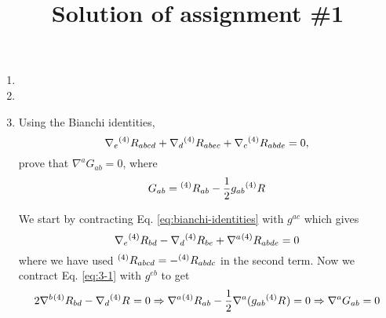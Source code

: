 \documentclass[10pt]{article}
\title{Solution of assignment \#1}
\begin{document}
\maketitle
\begin{enumerate}
\item
\item
\item Using the Bianchi identities,
  \begin{equation}
    \label{eq:bianchi-identities}
    \nabla_e{}^{(4)}R_{abcd} + \nabla_d{}^{(4)}R_{abec} + \nabla_c{}^{(4)}R_{abde} = 0,
  \end{equation}
  prove that $\nabla^aG_{ab} = 0$, where
  \begin{equation}
    \label{eq:Gab}
    G_{ab} = {}^{(4)}R_{ab} - \frac{1}{2}g_{ab} {}^{(4)}R_{}
  \end{equation}

  We start by contracting Eq. \eqref{eq:bianchi-identities} with $g^{ac}$ which gives
  \begin{equation}
    \label{eq:3-1}
    \nabla_{e}{}^{(4)}R_{bd} - \nabla_d {}^{(4)}R_{be} + \nabla^a{}^{(4)}R_{abde} = 0
  \end{equation}
  where we have used ${}^{(4)}R_{abcd} = - {}^{(4)}R_{abdc}$ in the second term. Now we contract Eq. \eqref{eq:3-1} with $g^{eb}$ to get
  \begin{equation}
    \label{eq:}
    2 \nabla^b {}^{(4)}R_{bd} - \nabla_d {}^{(4)}R_{} = 0 \Rightarrow \nabla^a{}^{(4)}R_{ab} - \frac{1}{2} \nabla^a (g_{ab}{}^{(4)}R_{}) = 0 \Rightarrow \nabla^a G_{ab} = 0
  \end{equation}
\end{enumerate}
\end{document}
